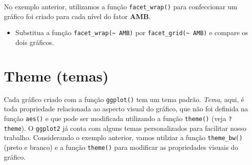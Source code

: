 \documentclass[
]{book}
\providecommand{\tightlist}{%
  \setlength{\itemsep}{0pt}\setlength{\parskip}{0pt}}
\begin{document}
\begin{dica}
No exemplo anterior, utilizamos a função \texttt{facet\_wrap()} para confeccionar um gráfico foi criado para cada nível do fator \textbf{AMB}.

\begin{itemize}
\tightlist
\item
  Substitua a função \texttt{facet\_wrap(\textasciitilde{}\ AMB)} por \texttt{facet\_grid(\textasciitilde{}\ AMB)} e compare os dois gráficos.
\end{itemize}
\end{dica}

\hypertarget{theme-temas}{%
\section{Theme (temas)}\label{theme-temas}}

Cada gráfico criado com a função \texttt{ggplot()} tem um tema padrão. \emph{Tema}, aqui, é toda propriedade relacionada ao aspecto visual do gráfico, que não foi definida na função \texttt{aes()} e que pode ser modificada utilizando a função \texttt{theme()} (veja \texttt{?theme}). O \texttt{ggplot2} já conta com alguns temas personalizados para facilitar nosso trabalho. Considerando o exemplo anterior, vamos utilziar a função \texttt{theme\_bw()} (preto e branco) e a função \texttt{theme()} para modificar as propriedades visuais do gráfico.
\end{document}
